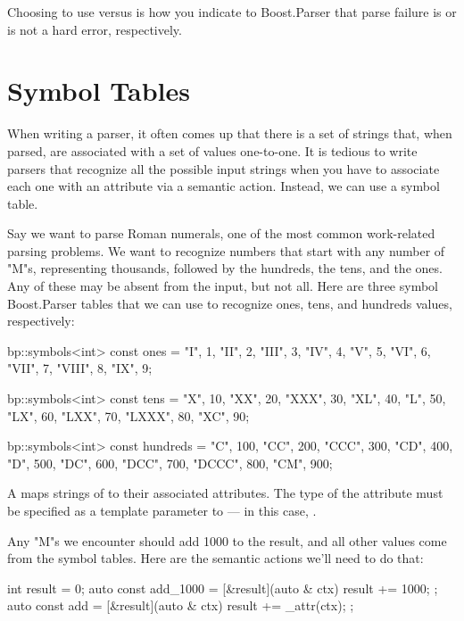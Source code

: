 \documentclass{MyBook}
\begin{document}
Choosing to use \ci{>} versus \ci{>>} is how you indicate to Boost.Parser that parse failure is or is not a hard error, respectively.

\section{Symbol Tables}

When writing a parser, it often comes up that there is a set of strings that, when parsed, are associated with a set of values one-to-one. It is tedious to write parsers that recognize all the possible input strings when you have to associate each one with an attribute via a semantic action. Instead, we can use a symbol table.

Say we want to parse Roman numerals, one of the most common work-related parsing problems. We want to recognize numbers that start with any number of "M"s, representing thousands, followed by the hundreds, the tens, and the ones. Any of these may be absent from the input, but not all. Here are three symbol Boost.Parser tables that we can use to recognize ones, tens, and hundreds values, respectively:

\begin{code}
bp::symbols<int> const ones = {
    {"I", 1},
    {"II", 2},
    {"III", 3},
    {"IV", 4},
    {"V", 5},
    {"VI", 6},
    {"VII", 7},
    {"VIII", 8},
    {"IX", 9}};

bp::symbols<int> const tens = {
    {"X", 10},
    {"XX", 20},
    {"XXX", 30},
    {"XL", 40},
    {"L", 50},
    {"LX", 60},
    {"LXX", 70},
    {"LXXX", 80},
    {"XC", 90}};

bp::symbols<int> const hundreds = {
    {"C", 100},
    {"CC", 200},
    {"CCC", 300},
    {"CD", 400},
    {"D", 500},
    {"DC", 600},
    {"DCC", 700},
    {"DCCC", 800},
    {"CM", 900}};
\end{code}

A  maps strings of  to their associated attributes. The type of the attribute must be specified as a template parameter to  --- in this case, .

Any "M"s we encounter should add 1000 to the result, and all other values come from the symbol tables. Here are the semantic actions we'll need to do that:

\begin{code}
int result = 0;
auto const add_1000 = [&result](auto & ctx) { result += 1000; };
auto const add = [&result](auto & ctx) { result += _attr(ctx); };
\end{code}
\end{document}
